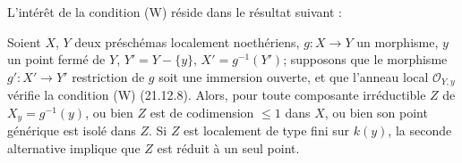 L'intérêt de la condition (W) réside dans le résultat suivant :

\begin{proposition}[21.12.10]
\label{IV.21.12.10}
Soient $X$, $Y$ deux préschémas localement noethériens, $g:X\to Y$ un morphisme,
$y$ un point fermé de $Y$, $Y'=Y-\{y\}$, $X'=g^{-1}(Y')$; supposons que le morphisme
$g':X'\to Y'$ restriction de $g$ soit une immersion ouverte, et que l'anneau local
$\mathcal O_{Y,y}$ vérifie la condition (W) (21.12.8). Alors, pour toute composante
irréductible $Z$ de $X_y=g^{-1}(y)$, ou bien $Z$ est de codimension $\leq1$ dans $X$,
ou bien son point générique est isolé dans $Z$. Si $Z$ est localement de type fini sur
$k(y)$, la seconde alternative implique que $Z$ est réduit à un seul point.
\end{proposition}

